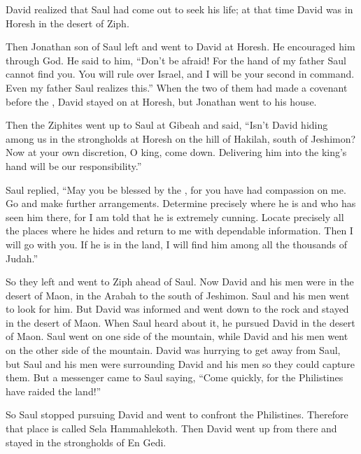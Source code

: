 {David
realized
that
Saul
had come out
to seek
his life;
at that time David
was in Horesh
in the desert
of Ziph.
\par }{\PP {}Then
Jonathan
son
of Saul
left and went
to
David
at Horesh.
He encouraged him
through
God.
He said
to him,
“Don’t
be afraid! For
the hand
of my father
Saul
cannot
find
you.
You will rule
over
Israel,
and I
will be
your second
in command. Even
my father
Saul
realizes
this.”
When
the two
of them had made
a covenant
before
the {}, David
stayed
on at Horesh,
but Jonathan
went
to his house.
\par }{\PP {}Then the Ziphites
went up
to
Saul
at Gibeah
and said,
“Isn’t
David
hiding
among us in the strongholds
at Horesh
on the hill
of Hakilah,
south
of Jeshimon?
Now
at your own discretion,
O king,
come down.
Delivering him
into
the king’s
hand will be our responsibility.”
\par }{\PP {}Saul
replied,
“May you
be blessed
by the
{}, for
you have had compassion
on me.
Go
and make further
arrangements.
Determine
precisely
where
he is
and who
has seen
him there,
for
I am told
that he
is extremely cunning.
Locate
precisely
all
the places
where
he hides
and return
to
me with
dependable
information. Then I will go
with
you. If
he is
in the land,
I will find
him
among all
the thousands
of Judah.”
\par }{\PP {}So they left
and went
to Ziph
ahead
of Saul.
Now David
and his men
were in the desert
of Maon,
in the Arabah
to
the south
of Jeshimon.
Saul
and his men
went to look
for him. But David
was informed
and went down
to the rock
and stayed
in the desert
of Maon.
When Saul
heard
about it, he pursued
David
in the desert
of Maon.
Saul
went
on one side
of the mountain,
while
David
and his men
went on the other side
of the mountain.
David
was hurrying
to get away
from Saul,
but Saul
and his men
were surrounding
David
and his men
so they could capture them.
But a messenger
came
to
Saul
saying,
“Come
quickly,
for
the Philistines
have raided
the land!”
\par }{\PP {}So Saul
stopped
pursuing
David
and went
to confront
the Philistines.
Therefore
that place
is called
Sela Hammahlekoth.
Then David
went up
from there
and stayed
in the strongholds
of En Gedi.

}
